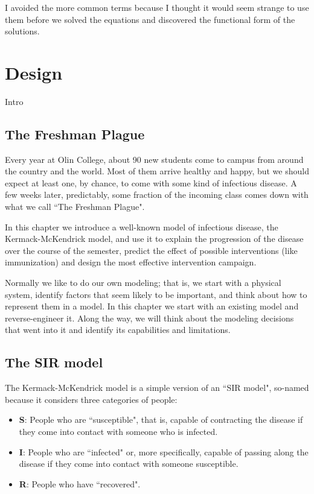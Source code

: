 \documentclass[12pt]{book}
\theoremstyle{exercise}
\begin{document}
I avoided the more common terms because I thought it would seem strange to use them before we solved the equations and discovered the functional form of the solutions.




\chapter{Design}

Intro

\section{The Freshman Plague}

Every year at Olin College, about 90 new students come to campus from around the country and the world.  Most of them arrive healthy and happy, but we should expect at least one, by chance, to come with some kind of infectious disease.  A few weeks later, predictably, some fraction of the incoming class comes down with what we call ``The Freshman Plague".

In this chapter we introduce a well-known model of infectious disease, the Kermack-McKendrick model, and use it to explain the progression of the disease over the course of the semester, predict the effect of possible interventions (like immunization) and design the most effective intervention campaign.

Normally we like to do our own modeling; that is, we start with a physical system, identify factors that seem likely to be important, and think about how to represent them in a model.  In this chapter we start with an existing model and reverse-engineer it.  Along the way, we will think about the modeling decisions that went into it and identify its capabilities and limitations.

\section{The SIR model}

The Kermack-McKendrick model is a simple version of an ``SIR model", so-named because it considers three categories of people:

\begin{itemize}

\item {\bf S}: People who are ``susceptible", that is, capable of contracting the disease if they come into contact with someone who is infected.

\item {\bf I}: People who are ``infected" or, more specifically, capable of passing along the disease if they come into contact with someone susceptible.

\item {\bf R}: People who have ``recovered".

\end{itemize}
  
\end{document}

